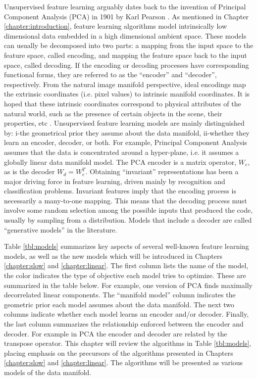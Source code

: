 Unsupervised feature learning arguably dates back to the invention of Principal
Component Analysis (PCA) in 1901 by Karl Pearson \cite{PCA}. As mentioned in
Chapter \ref{chapter:introduction}, feature learning algorithms model
intrinsically low dimensional data embedded in a high dimensional ambient
space. These models can usually be decomposed into two parts: a mapping from
the input space to the feature space, called encoding, and mapping the feature
space back to the input space, called decoding. If the encoding or decoding
processes have corresponding functional forms, they are referred to as the
``encoder'' and ``decoder'', respectively.  From the natural image manifold
perspective, ideal encodings map the extrinsic coordinates (i.e. pixel values)
to intrinsic manifold coordinates. It is hoped that these intrinsic coordinates
correspond to physical attributes of the natural world, such as the presence of
certain objects in the scene, their properties, etc \cite{nair2008,capsules}.
Unsupervised feature learning models are mainly distinguished by: i-the
geometrical prior they assume about the data manifold, ii-whether they learn an
encoder, decoder, or both. For example, Principal Component Analysis assumes
that the data is concentrated around a hyper-plane, i.e. it assumes a globally
linear data manifold model. The PCA encoder is a matrix operator, $W_e$, as is
the decoder $W_d=W_e^T$.  Obtaining ``invariant'' representations has been a
major driving force in feature learning, driven mainly by recognition and
classification problems.  Invariant features imply that the encoding process is
necessarily a many-to-one mapping. This means that the decoding process must
involve some random selection among the possible inputs that produced the code,
usually  by sampling from a distribution. Models that include a decoder are
called ``generative models'' in the literature. 

Table \ref{tbl:models} summarizes key aspects of several well-known feature
learning models, as well as the new models which will be introduced in Chapters
\ref{chapter:slow} and \ref{chapter:linear}. The first column lists the name of
the model, the color indicates the type of objective each model tries to
optimize.  These are summarized in the table below. For example, one version of
PCA finds maximally decorrelated linear components. The ``manifold model''
column indicates the geometric prior each model assumes about the data
manifold. The next two columns indicate whether each model learns an encoder
and/or decoder.  Finally, the last column summarizes the relationship enforced
between the encoder and decoder. For example in PCA the encoder and decoder are
related by the transpose operator. This chapter will review the algorithms in
Table \ref{tbl:models}, placing emphasis on the precursors of the algorithms
presented in Chapters \ref{chapter:slow} and \ref{chapter:linear}. The
algorithms will be presented as various models of the data manifold.

